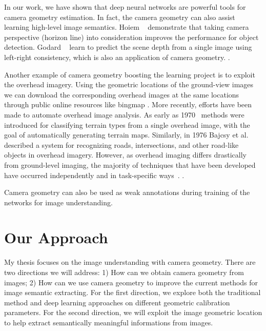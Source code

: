 In our work, we have shown that deep neural networks are powerful
tools for camera geometry estimation. In fact, the camera
geometry can also assist learning high-level image semantics.
Hoiem \etal~\cite{hoiem2008putting} demonstrate that taking camera
perspective (horizon line) into consideration improves the performance
for object detection. Godard \etal~\cite{godard2017unsupervised}
learn to predict the scene depth from a single image using left-right
consistency, which is also an application of camera geometry.
.

Another example of camera geometry boosting the learning project is to
exploit the overhead imagery. Using the geometric locations of the
ground-view images we can download the corresponding overhead images
at the same locations through public online resources like bingmap
.
%
 More recently, efforts have been made to
automate overhead image analysis. As early as
1970~\cite{idelsohn1970learning} methods were introduced for
classifying terrain types from a single overhead image, with the goal
of automatically generating terrain maps.  Similarly, in 1976 Bajcsy
et al.~\cite{bajcsy1976computer} described a system for recognizing
roads, intersections, and other road-like objects in overhead imagery.
However, as overhead imaging differs drastically from ground-level
imaging, the majority of techniques that have been developed have
occurred independently and in task-specific ways~\cite{Rozen}.
.

Camera geometry can also be used as weak annotations during training
of the networks for image understanding.

\section{Our Approach}
My thesis focuses on the image understanding with camera geometry.
There are two directions we will address: 1) How can we obtain camera
geometry from images; 2) How can we use camera geometry to improve the
current methods for image semantic extracting. For the first direction,
we explore both the traditional method and deep learning approaches on
different geometric calibration parameters. For the second direction,
we will exploit the image geometric location to help extract
semantically meaningful informations from images.

